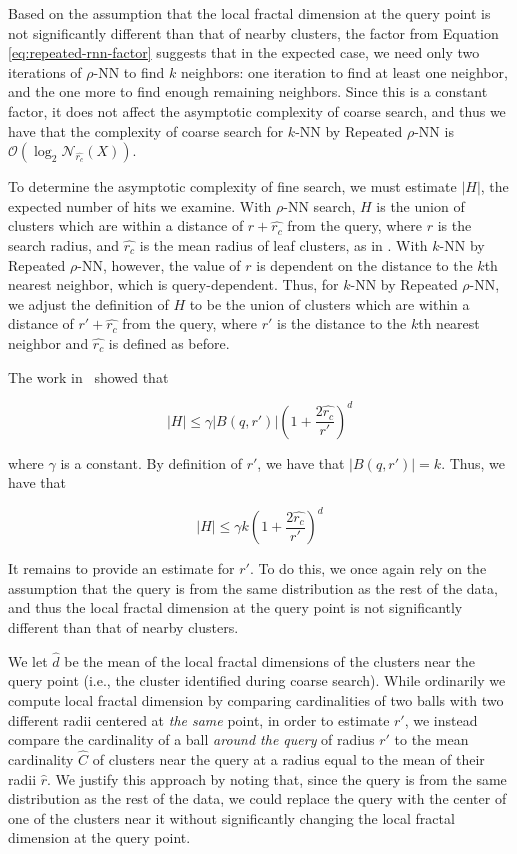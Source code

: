 Based on the assumption that the local fractal dimension at the query point is not significantly different than that of nearby clusters, the factor from Equation \ref{eq:repeated-rnn-factor} suggests that in the expected case, we need only two iterations of $\rho$-NN to find $k$ neighbors:
one iteration to find at least one neighbor, and the one more to find enough remaining neighbors.
Since this is a constant factor, it does not affect the asymptotic complexity of coarse search, and thus we have that the complexity of coarse search for $k$-NN by Repeated $\rho$-NN is $\mathcal{O}(\log_2\mathcal{N}_{\hat{r_c}}(X))$.

To determine the asymptotic complexity of fine search, we must estimate $|H|$, the expected number of hits we examine.
With $\rho$-NN search, $H$ is the union of clusters which are within a distance of $r + \hat{r_c}$ from the query, where $r$ is the search radius, and $\hat{r_c}$ is the mean radius of leaf clusters, as in \cite{yu2015entropy}.
With $k$-NN by Repeated $\rho$-NN, however, the value of $r$ is dependent on the distance to the $k$th nearest neighbor, which is query-dependent.
Thus, for $k$-NN by Repeated $\rho$-NN, we adjust the definition of $H$ to be the union of clusters which are within a distance of $r' + \hat{r_c}$ from the query, where $r'$ is the distance to the $k$th nearest neighbor and $\hat{r_c}$ is defined as before.

The work in~\cite{yu2015entropy} showed that

\begin{equation*}
    |H| \leq \gamma |B(q, r')|\left(1+ \frac{2\hat{r_c}}{r'}\right)^d
\end{equation*}

where $\gamma$ is a constant. 
By definition of 
$r'$, we have that $|B(q, r')| = k$. Thus, we have that

\begin{equation}
    |H| \leq \gamma k\left(1+ \frac{2\hat{r_c}}{r'}\right)^d
    \label{eq:methods:knn-by-rnn-fine-search}
\end{equation}

It remains to provide an estimate for $r'$. 
To do this, we once again rely on the assumption that the query is from the same distribution as the rest of the data, and thus the local fractal dimension at the query point is not significantly different than that of nearby clusters.

We let $\hat{d}$ be the mean of the local fractal dimensions of the clusters near the query point (i.e., the cluster identified during coarse search).
While ordinarily we compute local fractal dimension by comparing cardinalities of two balls with two different radii centered at \emph{the same} point, in order to estimate $r'$, we instead compare the cardinality of a ball \emph{around the query} of radius $r'$ to the mean cardinality $\hat{C}$ of clusters near the query at a radius equal to the mean of their radii $\hat{r}$.
We justify this approach by noting that, since the query is from the same distribution as the rest of the data, we could replace the query with the center of one of the clusters near it without significantly changing the local fractal dimension at the query point. 

